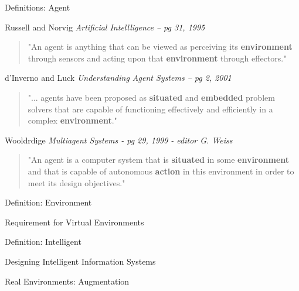 \documentclass[aspectratio=1610,xcolor=dvipsnames,t]{beamer}
\begin{document}
\begin{frame}{Definitions: Agent} 
    \begin{block}{Russell and Norvig \emph{Artificial Intellligence -- pg 31, 1995}}
        \begin{quote}
            "An agent is anything that can be viewed as perceiving its 
            \textbf{environment} through sensors and acting upon that
            \textbf{environment} through effectors."
        \end{quote}
    \end{block} 

    \begin{block}{d'Inverno and Luck \emph{Understanding Agent Systems -- pg 2, 2001}}
        \begin{quote}
            "... agents have been proposed as \textbf{situated} and 
            \textbf{embedded} problem solvers that are capable of functioning
            effectively and efficiently in a complex \textbf{environment}."
         \end{quote} 
    \end{block} 

    \begin{block}{Wooldrdige \emph{Multiagent Systems - pg 29, 1999 - editor G. Weiss}}
        \begin{quote}
            "An agent is a computer system that is \textbf{situated} in some
            \textbf{environment} and that is capable of autonomous 
            \textbf{action} in this environment in order to meet its
            design objectives."
        \end{quote}
    \end{block} 

\end{frame} 

\begin{frame}{Definition: Environment}
\end{frame} 

\begin{frame}{Requirement for Virtual Environments} 
\end{frame} 

\begin{frame}{Definition: Intelligent}
\end{frame} 

\begin{frame}{Designing Intelligent Information Systems} 
\end{frame}

\begin{frame}{Real Environments: Augmentation} 
\end{frame} 
\end{document}
